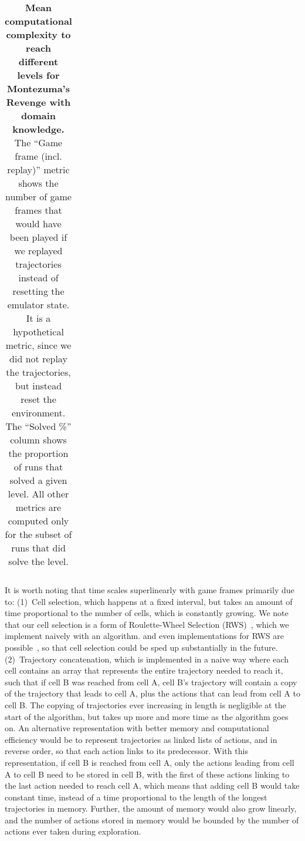 \documentclass{article}
\begin{document}
\begin{table}[!htbp]
\begin{center}
\begin{tabular}{ c | c c c | c }
        \end{tabular}
        \vspace{4mm}
        \caption{\textbf{Mean computational complexity to reach different levels for Montezuma's Revenge with domain knowledge.} The ``Game frame (incl. replay)'' metric shows the number of game frames that would have been played if we replayed trajectories instead of resetting the emulator state. It is a hypothetical metric, since we did not replay the trajectories, but instead reset the environment. The ``Solved \%'' column shows the proportion of runs that solved a given level. All other metrics are computed only for the subset of runs that did solve the level.}
        \label{tab:mont_level_perf}
    \end{center}
\end{table}

It is worth noting that time scales superlinearly with game frames primarily due to: (1)~Cell selection, which happens at a fixed interval, but takes an amount of time proportional to the number of cells, which is constantly growing. We note that our cell selection is a form of Roulette-Wheel Selection (RWS)~\cite{goldberg:gabook89}, which we implement naively with an  algorithm.  and even  implementations for RWS are possible~\cite{Lipowski2011RoulettewheelSV}, so that cell selection could be sped up substantially in the future. (2)~Trajectory concatenation, which is implemented in a naive way where each cell contains an array that represents the entire trajectory needed to reach it, such that if cell B was reached from cell A, cell B's trajectory will contain a copy of the trajectory that leads to cell A, plus the actions that can lead from cell A to cell B. The copying of trajectories ever increasing in length is negligible at the start of the algorithm, but takes up more and more time as the algorithm goes on. An alternative representation with better memory and computational efficiency would be to represent trajectories as linked lists of actions, and in reverse order, so that each action links to its predecessor. With this representation, if cell B is reached from cell A, only the actions leading from cell A to cell B need to be stored in cell B, with the first of these actions linking to the last action needed to reach cell A, which means that adding cell B would take constant time, instead of a time proportional to the length of the longest trajectories in memory. Further, the amount of memory would also grow linearly, and the number of actions stored in memory would be bounded by the number of actions ever taken during exploration.
\end{document}
